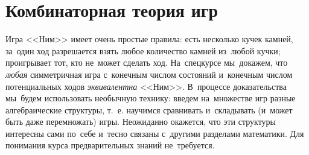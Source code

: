 
\section*{Комбинаторная теория игр}



Игра <<Ним>> имеет очень простые правила:
есть несколько кучек камней, за~один ход разрешается взять любое количество
камней из~любой кучки;
проигрывает тот, кто не~может сделать ход.
На~спецкурсе мы~докажем, что \emph{любая} симметричная игра с~конечным числом
состояний и~конечным числом потенциальных ходов \emph{эквивалентна} <<Ним>>.
В~процессе доказательства мы~будем использовать необычную технику:
введем на~множестве игр разные алгебраические структуры, т.~е. научимся
сравнивать и~складывать (и~может быть даже перемножать) игры.
Неожиданно окажется, что эти структуры интересны сами по~себе и~тесно связаны
с~другими разделами математики.
Для понимания курса предварительных знаний не~требуется.

